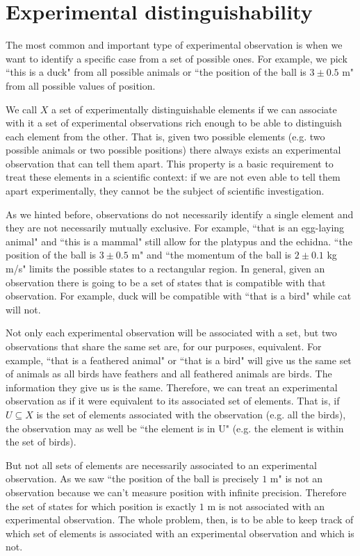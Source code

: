 \documentclass[11pt,letterpaper,fleqn]{memoir} %
\begin{document}
\section{Experimental distinguishability}

The most common and important type of experimental observation is when we want to identify a specific case from a set of possible ones. For example, we pick ``this is a duck" from all possible animals or ``the position of the ball is $3 \pm 0.5$ m" from all possible values of position.

We call $X$ a set of experimentally distinguishable elements if we can associate with it a set of experimental observations rich enough to be able to distinguish each element from the other. That is, given two possible elements (e.g. two possible animals or two possible positions) there always exists an experimental observation that can tell them apart. This property is a basic requirement to treat these elements in a scientific context: if we are not even able to tell them apart experimentally, they cannot be the subject of scientific investigation.

As we hinted before, observations do not necessarily identify a single element and they are not necessarily mutually exclusive. For example, ``that is an egg-laying animal" and ``this is a mammal" still allow for the platypus and the echidna. ``the position of the ball is $3 \pm 0.5$ m" and ``the momentum of the ball is $2 \pm 0.1$ kg m/s" limits the possible states to a rectangular region. In general, given an observation there is going to be a set of states that is compatible with that observation. For example, duck will be compatible with ``that is a bird" while cat will not.

Not only each experimental observation will be associated with a set, but two observations that share the same set are, for our purposes, equivalent. For example, ``that is a feathered animal" or ``that is a bird" will give us the same set of animals as all birds have feathers and all feathered animals are birds. The information they give us is the same. Therefore, we can treat an experimental observation as if it were equivalent to its associated set of elements. That is, if $U \subseteq X$ is the set of elements associated with the observation (e.g. all the birds), the observation may as well be ``the element is in U" (e.g. the element is within the set of birds).

But not all sets of elements are necessarily associated to an experimental observation. As we saw ``the position of the ball is precisely $1$ m" is not an observation because we can't measure position with infinite precision. Therefore the set of states for which position is exactly $1$ m is not associated with an experimental observation. The whole problem, then, is to be able to keep track of which set of elements is associated with an experimental observation and which is not.
\end{document}
